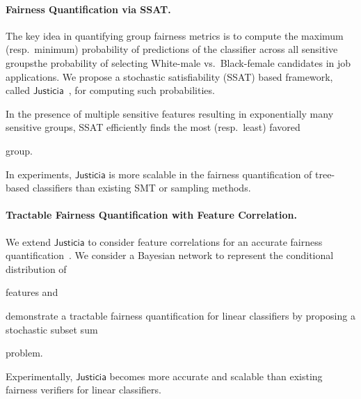\documentclass[10pt]{article}
\newif\iflongproposal
\begin{document}
	\paragraph{Fairness Quantification via SSAT.} The key idea in quantifying group fairness metrics is to compute the maximum (resp.\ minimum) probability of predictions of the classifier across all sensitive groups\textemdash the probability of selecting White-male vs.\ Black-female candidates in job applications. We propose a stochastic satisfiability (SSAT) based framework, called $\mathsf{Justicia}$~\cite{ghosh2021justicia}, for computing such probabilities. 
	\iflongproposal
	More specifically, the maximum probability becomes the solution of an existential-random (ER)-SSAT formula\textemdash we encode the classifier as a Boolean formula, the feature distribution via random Boolean variables, and compute the maximum conditional probability of the satisfaction of the formula for existentially quantified sensitive features.
	\fi
	In the presence of multiple sensitive features resulting in exponentially many sensitive groups, SSAT efficiently finds the most (resp.\ least) favored
	\iflongproposal
	group by the classifier, thanks to the progress in satisfiability (SAT) solving, and particularly in weighted model counting problem.
	\else
	group.
	\fi 
	In experiments, $\mathsf{Justicia}$ is more scalable in the fairness quantification of tree-based classifiers than existing SMT or sampling methods.
	
	
	\paragraph{Tractable Fairness Quantification with Feature Correlation.} We extend $\mathsf{Justicia}$ to consider feature correlations for an accurate fairness quantification~\cite{ghosh2022algorithmic}. We consider a Bayesian network to represent the conditional distribution of 
	\iflongproposal
	features\textemdash the SSAT formula grows with the complexity of the Bayesian network, calling for a more scalable solution.	Therefore, we
	\else
	features and
	\fi
	demonstrate a tractable fairness quantification for linear classifiers by proposing a stochastic subset sum 
	\iflongproposal
	problem, which admits an efficient dynamic programming solution with pseudo-polynomial complexity.
	\else
	problem.
	\fi 
	Experimentally, $\mathsf{Justicia}$ becomes more accurate and scalable than existing fairness verifiers for linear classifiers.
	
	
	
\end{document}
